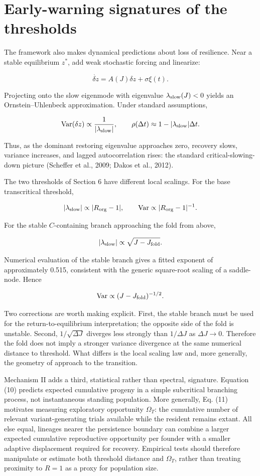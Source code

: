 \documentclass[11pt]{article}
\begin{document}
\section{Early-warning signatures of the
thresholds}
The framework also makes dynamical predictions about loss of resilience.
Near a stable equilibrium \(z^*\), add weak stochastic forcing and
linearize:

\[
\dot{\delta z} = A(J)\delta z + \sigma \xi(t).
\]

Projecting onto the slow eigenmode with eigenvalue
\(\lambda_{\rm slow}(J)<0\) yields an Ornstein--Uhlenbeck approximation.
Under standard assumptions,

\[
{\rm Var}(\delta z) \propto \frac{1}{|\lambda_{\rm slow}|}, \qquad \rho(\Delta t) \approx 1 - |\lambda_{\rm slow}|\Delta t.
\]

Thus, as the dominant restoring eigenvalue approaches zero, recovery
slows, variance increases, and lagged autocorrelation rises: the
standard critical-slowing-down picture (Scheffer et al., 2009; Dakos et
al., 2012).

The two thresholds of Section 6 have different local scalings. For the
base transcritical threshold,

\[
|\lambda_{\rm slow}| \propto |R_{\rm org}-1|, \qquad {\rm Var} \propto |R_{\rm org}-1|^{-1}.
\]

For the stable \(C\)-containing branch approaching the fold from above,

\[
|\lambda_{\rm slow}| \propto \sqrt{J - J_{\rm fold}}.
\]

Numerical evaluation of the stable branch gives a fitted exponent of
approximately 0.515, consistent with the generic square-root scaling of
a saddle-node. Hence

\[
{\rm Var} \propto (J-J_{\rm fold})^{-1/2}.
\]

Two corrections are worth making explicit. First, the stable branch must
be used for the return-to-equilibrium interpretation; the opposite side
of the fold is unstable. Second, \(1/\sqrt{\Delta J}\) diverges less
strongly than \(1/\Delta J\) as \(\Delta J \to 0\). Therefore the fold
does not imply a stronger variance divergence at the same numerical
distance to threshold. What differs is the local scaling law and, more
generally, the geometry of approach to the transition.

Mechanism II adds a third, statistical rather than spectral, signature.
Equation (10) predicts expected cumulative progeny in a simple
subcritical branching process, not instantaneous standing population.
More generally, Eq. (11) motivates measuring exploratory opportunity
\(\Omega_T\): the cumulative number of relevant variant-generating
trials available while the resident remains extant. All else equal,
lineages nearer the persistence boundary can combine a larger expected
cumulative reproductive opportunity per founder with a smaller adaptive
displacement required for recovery. Empirical tests should therefore
manipulate or estimate both threshold distance and \(\Omega_T\), rather
than treating proximity to \(R=1\) as a proxy for population size.
\end{document}
